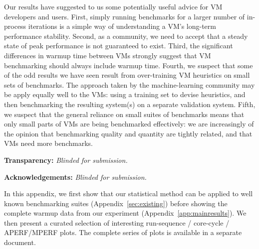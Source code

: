 \documentclass[preprint,numbers,10pt]{sigplanconf}
\begin{document}
Our results have suggested to us some potentially useful advice for VM
developers and users. First, simply running benchmarks for a larger number of
in-process iterations is a simple way of understanding a VM's long-term
performance stability. Second, as a community, we need to accept that a steady
state of peak performance is not guaranteed to exist. Third, the significant
differences in warmup time between VMs strongly suggest that VM benchmarking
should always include warmup time. Fourth, we suspect that some of the odd
results we have seen result from over-training VM heuristics on small sets of
benchmarks. The approach taken by the machine-learning community may be apply
equally well to the VMs: using a training set to devise heuristics, and then
benchmarking the resulting system(s) on a separate validation system. Fifth, we suspect
that the general reliance on small suites of benchmarks means that only
small parts of VMs are being benchmarked effectively: we are increasingly of the
opinion that benchmarking quality and quantity are tightly related, and that VMs
need more benchmarks.

%

\textbf{Transparency:} \emph{Blinded for submission.}

\textbf{Acknowledgements:} \emph{Blinded for submission.}




\clearpage

\appendix

\noindent In this appendix, we first show that our statistical method
can be applied to well known benchmarking suites (Appendix~\ref{sec:existing})
before showing the complete warmup data from our experiment
(Appendix~\ref{app:mainresults}). We
then present a curated selection of interesting run-sequence / core-cycle /
APERF/MPERF plots. The complete series of plots is available in a separate
document.
\end{document}
